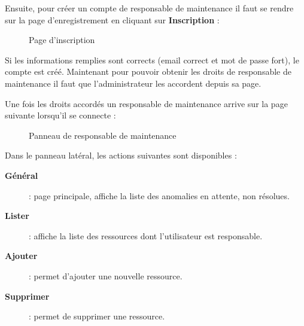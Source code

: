 Ensuite, pour créer un compte de responsable de maintenance il faut se rendre sur la page
d'enregistrement en cliquant sur \textbf{Inscription} :
\begin{figure}[h]
    \centering
    \caption{Page d'inscription}
\end{figure}

Si les informations remplies sont corrects (email correct et mot de passe fort), le compte est
créé. Maintenant pour pouvoir obtenir les droits de responsable de maintenance il faut que
l'administrateur les accordent depuis sa page.\newline

Une fois les droits accordés un responsable de maintenance arrive sur la page suivante lorsqu'il
se connecte :
\begin{figure}[h]
    \centering
    \caption{Panneau de responsable de maintenance}
\end{figure}

Dans le panneau latéral, les actions suivantes sont disponibles :
\begin{description}
    \item[\textbf{Général}] : page principale, affiche la liste des anomalies en attente, non
        résolues.
    \item[\textbf{Lister}] : affiche la liste des ressources dont l'utilisateur est responsable.
    \item[\textbf{Ajouter}] : permet d'ajouter une nouvelle ressource.
    \item[\textbf{Supprimer}] : permet de supprimer une ressource.
\end{description}




